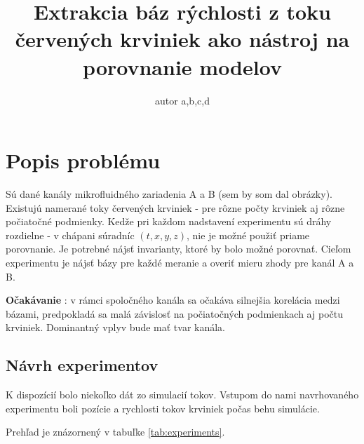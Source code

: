 \documentclass[10pt,a4paper]{article}
\begin{document}
\title{Extrakcia báz rýchlosti z toku červených krviniek ako nástroj na porovnanie modelov}
\author{autor a,b,c,d}
\date{}
\maketitle
\thispagestyle{empty}


\section{Popis problému}

Sú dané kanály mikrofluidného zariadenia A a B (sem by som dal obrázky).
Existujú namerané toky červených krviniek - pre rôzne počty krviniek aj rôzne počiatočné podmienky.
Kedže pri každom nadstavení experimentu sú dráhy rozdielne - v chápani súradníc $(t, x, y, z)$,
nie je možné použiť priame porovnanie.
Je potrebné nájsť invarianty, ktoré by bolo možné porovnať.
Cieľom experimentu je nájsť bázy pre každé meranie a overiť mieru zhody pre kanál A a B.


{\bf Očakávanie} : v rámci spoločného kanála sa očakáva silnejšia korelácia medzi bázami,
predpokladá sa malá závislosť na počiatočných podmienkach aj počtu krviniek. Dominantný
vplyv bude mať tvar kanála.


\subsection{Návrh experimentov}

K dispozícií bolo niekoľko dát zo simulacií tokov. Vstupom do nami navrhovaného experimentu
boli pozície a rychlosti tokov krviniek počas behu simulácie.

Prehľad je znázornený v tabuľke \ref{tab:experiments}.
\end{document}
